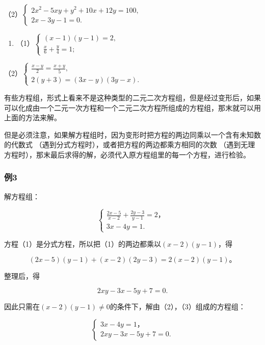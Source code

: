 （2）\(\left\{ \begin{array}{l} 2x^{2} - 5xy + y^{2} + 10x + 12y = 100, \\ 2x - 3y - 1 = 0. \end{array} \right.\)

\begin{enumerate}[start=7]
\item
  （1）\(\left\{ \begin{array}{l} (x - 1)(y - 1) = 2, \\ \frac{x}{6} + \frac{y}{4} = 1; \end{array} \right.\)
\end{enumerate}

（2）\(\left\{ \begin{array}{l} \frac{x - y}{2} = \frac{x + y}{5}, \\ 2(y + 3) = (3x - y)(3y - x). \end{array} \right.\)

有些方程组，形式上看来不是这种类型的二元二次方程组，但是经过变形后，如果可以化成由一个二元一次方程和一个二元二次方程所组成的方程组，那末就可以用上面的方法来解。

但是必须注意，如果解方程组时，因为变形时把方程的两边同乘以一个含有未知数的代数式
（遇到分式方程时），或者把方程的两边都乘方相同的次数
（遇到无理方程时），那末最后求得的解，必须代入原方程组里的每一个方程，进行检验。

\subsubsection{例3}

解方程组：

\[
\left\{ \begin{array}{l} \frac{2 x - 5}{x - 2} + \frac{2 y - 3}{y - 1} = 2\text{，} \\ 3 x - 4 y = 1. \end{array} \right. \tag{1}
\]

方程（1）是分式方程，所以把（1）的两边都乘以\((x - 2)(y - 1)\)，得

\[
(2 x - 5) (y - 1) + (x - 2) (2 y - 3) = 2 (x - 2) (y - 1)\text{。}
\]

整理后，得

\[
2 x y - 3 x - 5 y + 7 = 0. \tag{3}
\]

因此只需在\((x - 2)(y - 1) \neq 0\)的条件下，解由（2），（3）组成的方程组：

\[
\left\{ \begin{array}{l} 3 x - 4 y = 1\text{，} \\ 2 x y - 3 x - 5 y + 7 = 0. \end{array} \right.
\]

